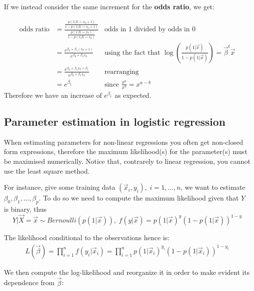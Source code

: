     If we instead consider the same increment for the \textbf{odds ratio}, we
    get:

    \begin{align*}
      \text{odds ratio}
      & = \frac{\frac{p(1|X=x_0+1)}{1-p(1|X=x_0+1)}}{\frac{p(1|X=x_0)}{1-p(1|X=x_0)}} 
      & \text{odds in 1 divided by odds in 0}\\
      & = \frac{e^{\beta_0 + \beta_1 (x_0 + 1)}}{e^{\beta_0 + \beta_1 x_0}}
      & \text{using the fact that } \log\left(\frac{p(1|\vec{x})}{1 - p(1|\vec{x})}\right)= \vec{\beta}^t\vec{x}\\
      & = \frac{e^{\beta_0 + \beta_1x_0 + \beta_1}}{e^{\beta_0 + \beta_1 x_0}} 
      & \text{rearranging}\\
      & = e^{\beta_1}
      & \text{since } \frac{x^a}{x^b} = x^{a-b}
    \end{align*}
    Therefore we have an increase of \textbf{$e^{\beta_1}$} as expected.

    \subsection{Parameter estimation in logistic regression}
    When estimating parameters for non-linear regressions you often get
    non-closed form expressions, therefore the maximum likelihood(s) for the
    parameter(s) must be maximised numerically. Notice that, contrarely to
    linear regression, you cannot use the least square method.

    For instance, give some training data $(\vec{x}_i, y_i), \; i=1, \dots, n$,
    we want to estimate $\beta_0, \beta_1, \dots, \beta_p$. To do so we need to
    compute the maximum likelihood given that $Y$ is binary, thus
    $$Y|\vec{X} = \vec{x} \sim Bernoulli(p(1|\vec{x})), \; f(y|\vec{x}) =
    p(1|\vec{x})^y(1-p(1|\vec{x}))^{1-y}$$
    
    The likelihood conditional to the observations hence is:
    \begin{align*}
    L(\vec{\beta}) = \prod_{i=1}^{n}f(y_i|\vec{x}_i) = \prod_{i=1}^{n}p(1|\vec{x}_i)^{y_i}(1-p(1|\vec{x}_i))^{1-y_i}
    \end{align*} %
    
    We then compute the log-likelihood and reorganize it in order to make
    evident its dependence from $\vec{\beta}$:
    
